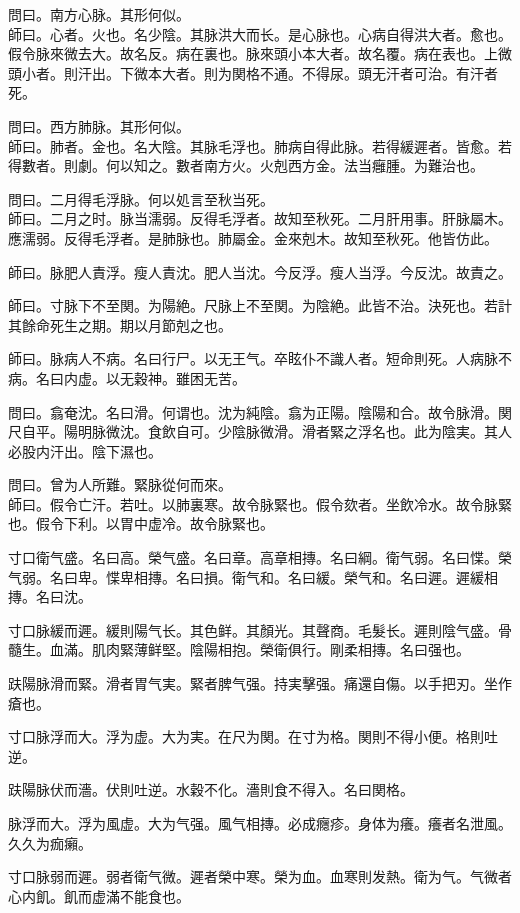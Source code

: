 \documentclass[12pt,oneside,UTF8,b5paper]{ctexbook}她她她她她她她
\begin{document}
問曰。南方心脉。其形何似。\\
師曰。心者。火也。名少陰。其脉洪大而长。是心脉也。心病自得洪大者。愈也。假令脉來微去大。故名反。病在裏也。脉來頭小本大者。故名覆。病在表也。上微頭小者。則汗出。下微本大者。則为関格不通。不得尿。頭无汗者可治。有汗者死。

問曰。西方肺脉。其形何似。\\
師曰。肺者。金也。名大陰。其脉毛浮也。肺病自得此脉。若得緩遲者。皆愈。若得數者。則劇。何以知之。數者南方火。火剋西方金。法当癰腫。为難治也。

問曰。二月得毛浮脉。何以処言至秋当死。\\
師曰。二月之时。脉当濡弱。反得毛浮者。故知至秋死。二月肝用事。肝脉屬木。應濡弱。反得毛浮者。是肺脉也。肺屬金。金來剋木。故知至秋死。他皆仿此。

師曰。脉肥人責浮。瘦人責沈。肥人当沈。今反浮。瘦人当浮。今反沈。故責之。

師曰。寸脉下不至関。为陽絶。尺脉上不至関。为陰絶。此皆不治。決死也。若計其餘命死生之期。期以月節剋之也。

師曰。脉病人不病。名曰行尸。以无王气。卒眩仆不識人者。短命則死。人病脉不病。名曰内虚。以无穀神。雖困无苦。

問曰。翕奄沈。名曰滑。何谓也。沈为純陰。翕为正陽。陰陽和合。故令脉滑。関尺自平。陽明脉微沈。食飲自可。少陰脉微滑。滑者緊之浮名也。此为陰実。其人必股内汗出。陰下濕也。

問曰。曾为人所難。緊脉從何而來。\\
師曰。假令亡汗。若吐。以肺裏寒。故令脉緊也。假令欬者。坐飲冷水。故令脉緊也。假令下利。以胃中虚冷。故令脉緊也。

寸口衛气盛。名曰高。榮气盛。名曰章。高章相摶。名曰綱。衛气弱。名曰惵。榮气弱。名曰卑。惵卑相摶。名曰損。衛气和。名曰緩。榮气和。名曰遲。遲緩相摶。名曰沈。

寸口脉緩而遲。緩則陽气长。其色鲜。其顏光。其聲商。毛髮长。遲則陰气盛。骨髓生。血滿。肌肉緊薄鲜堅。陰陽相抱。榮衛俱行。剛柔相摶。名曰强也。

趺陽脉滑而緊。滑者胃气実。緊者脾气强。持実擊强。痛還自傷。以手把刃。坐作瘡也。

寸口脉浮而大。浮为虚。大为実。在尺为関。在寸为格。関則不得小便。格則吐逆。

趺陽脉伏而濇。伏則吐逆。水穀不化。濇則食不得入。名曰関格。

脉浮而大。浮为風虚。大为气强。風气相摶。必成癮疹。身体为癢。癢者名泄風。久久为痂癩。

寸口脉弱而遲。弱者衛气微。遲者榮中寒。榮为血。血寒則发熱。衛为气。气微者心内飢。飢而虚滿不能食也。
\end{document}
